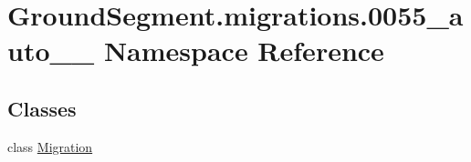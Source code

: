 \hypertarget{namespace_ground_segment_1_1migrations_1_10055__auto__20170327__1403}{}\section{Ground\+Segment.\+migrations.0055\+\_\+auto\+\_\+\_ Namespace Reference}
\label{namespace_ground_segment_1_1migrations_1_10055__auto__20170327__1403}
\subsection*{Classes}
\begin{DoxyCompactItemize}
\item 
class \hyperlink{class_ground_segment_1_1migrations_1_10055__auto__20170327__1403_1_1_migration}{Migration}
\end{DoxyCompactItemize}
